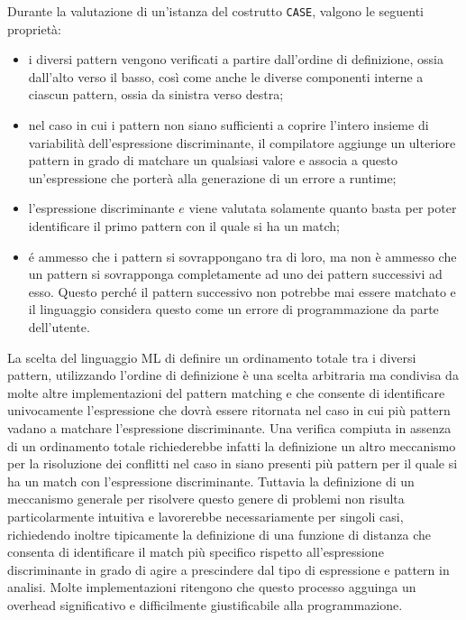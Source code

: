 Durante la valutazione di un'istanza del costrutto \texttt{CASE}, valgono le
seguenti proprietà:

\begin{itemize}
\item i diversi pattern vengono verificati a partire dall’ordine di
  definizione, ossia dall’alto verso il basso, così come anche le diverse
  componenti interne a ciascun pattern, ossia da sinistra verso destra;
\item nel caso in cui i pattern non siano sufficienti a coprire l’intero
  insieme di variabilità dell’espressione discriminante, il compilatore
  aggiunge un ulteriore pattern in grado di matchare un qualsiasi valore e
  associa a questo un’espressione che porterà alla generazione di un errore a
  runtime;
\item l’espressione discriminante $e$ viene valutata solamente quanto basta per
  poter identificare il primo pattern con il quale si ha un match;
\item é ammesso che i pattern si sovrappongano tra di loro, ma non è ammesso
  che un pattern si sovrapponga completamente ad uno dei pattern successivi ad
  esso. Questo perché il pattern successivo non potrebbe mai essere matchato e
  il linguaggio considera questo come un errore di programmazione da parte
  dell'utente.\\
\end{itemize}

La scelta del linguaggio ML di definire un ordinamento totale tra i diversi
pattern, utilizzando l’ordine di definizione è una scelta arbitraria ma
condivisa da molte altre implementazioni del pattern matching e che consente di
identificare univocamente l'espressione che dovrà essere ritornata nel caso in
cui più pattern vadano a matchare l'espressione discriminante. Una verifica
compiuta in assenza di un ordinamento totale richiederebbe infatti la
definizione un altro meccanismo per la risoluzione dei conflitti nel caso in
siano presenti più pattern per il quale si ha un match con l’espressione
discriminante. Tuttavia la definizione di un meccanismo generale per risolvere
questo genere di problemi non risulta particolarmente intuitiva e lavorerebbe
necessariamente per singoli casi, richiedendo inoltre tipicamente la
definizione di una funzione di distanza che consenta di identificare il match
più specifico rispetto all’espressione discriminante in grado di agire a
prescindere dal tipo di espressione e pattern in analisi. Molte implementazioni
ritengono che questo processo agguinga un overhead significativo e
difficilmente giustificabile alla programmazione.\\

